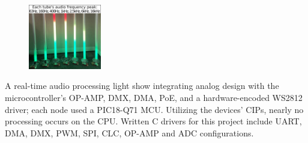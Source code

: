 \documentclass[
	10pt, %
]{FreemanCV}
\begin{document}
\begin{paracol}{2}
\setlength\intextsep{-5pt} %
\begin{figure} %
	\hspace*{-5pt} %
    \includegraphics[width=90pt]{dmx} %
\end{figure}

A real-time audio processing light show integrating analog design with the microcontroller's OP-AMP, DMX, DMA, PoE, and a hardware-encoded WS2812 driver; each node used a PIC18-Q71 MCU. Utilizing the devices' CIPs, nearly no processing occurs on the CPU.
Written C drivers for this project include UART, DMA, DMX, PWM, SPI, CLC, OP-AMP and ADC configurations.


\end{paracol}





	



\end{document}
